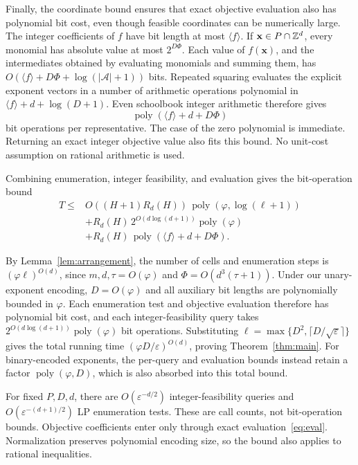 \documentclass[final,5p,times,twocolumn]{elsarticle}
\theoremstyle{definition}\newtheorem{definition}{Definition}[section]
\theoremstyle{remark}\newtheorem{remark}[theorem]{Remark}
\newcommand{\eps}{\varepsilon}
\newcommand{\poly}{\operatorname{poly}}
\begin{document}
Finally, the coordinate bound ensures that exact objective evaluation also has polynomial bit cost, even though feasible coordinates can be numerically large.
The integer coefficients of $f$ have bit length at most $\langle f\rangle$. If $\mathbf{x}\in P\cap\mathbb Z^d$, every monomial has absolute value at most $2^{D\Phi}$. Each value of $f(\mathbf{x})$, and the intermediates obtained by evaluating monomials and summing them, has $O(\langle f\rangle+D\Phi+\log(|\mathcal A|+1))$ bits. Repeated squaring evaluates the explicit exponent vectors in a number of arithmetic operations polynomial in $\langle f\rangle+d+\log(D+1)$. Even schoolbook integer arithmetic therefore gives
\begin{equation}\label{eq:eval}
 \poly(\langle f\rangle+d+D\Phi)
\end{equation}
bit operations per representative. The case of the zero polynomial is immediate. Returning an exact integer objective value also fits this bound. No unit-cost assumption on rational arithmetic is used.

Combining enumeration, integer feasibility, and evaluation gives the bit-operation bound
\[
\begin{aligned}
 T\le{}&O((H+1)R_d(H))\,
          \poly(\varphi,\log(\ell+1))\\
       &+R_d(H)\,2^{O(d\log(d+1))}\poly(\varphi)\\
       &+R_d(H)\,\poly(\langle f\rangle+d+D\Phi).
\end{aligned}
\]

By Lemma~\ref{lem:arrangement}, the number of cells and enumeration steps is $(\varphi\ell)^{O(d)}$, since $m,d,\tau=O(\varphi)$ and $\Phi=O(d^3(\tau+1))$. Under our unary-exponent encoding, $D=O(\varphi)$ and all auxiliary bit lengths are polynomially bounded in $\varphi$. Each enumeration test and objective evaluation therefore has polynomial bit cost, and each integer-feasibility query takes $2^{O(d\log(d+1))}\poly(\varphi)$ bit operations. Substituting $\ell=\max\{D^2,\lceil D/\sqrt\eps\rceil\}$ gives the total running time $(\varphi D/\eps)^{O(d)}$, proving Theorem~\ref{thm:main}. For binary-encoded exponents, the per-query and evaluation bounds instead retain a factor $\poly(\varphi,D)$, which is also absorbed into this total bound.

For fixed $P,D,d$, there are $O(\eps^{-d/2})$ integer-feasibility queries and $O(\eps^{-(d+1)/2})$ LP enumeration tests. These are call counts, not bit-operation bounds. Objective coefficients enter only through exact evaluation~\eqref{eq:eval}. Normalization preserves polynomial encoding size, so the bound also applies to rational inequalities.
\end{document}
